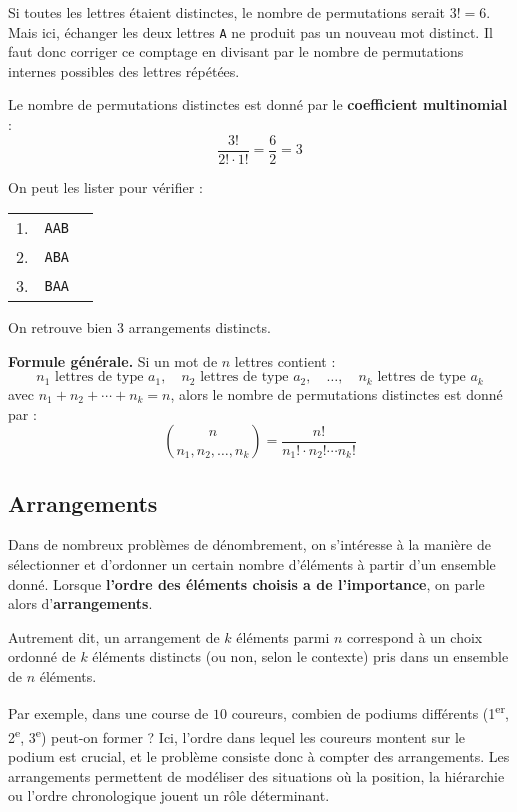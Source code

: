 \documentclass[12pt]{article}
\newcommand{\espace}{\vspace{1.5em}}
\newcommand{\petitespace}{\vspace{0.5cm}}
\newcommand{\1}{\bb{1}} %
\begin{document}
Si toutes les lettres étaient distinctes, le nombre de permutations serait $3! = 6$. Mais ici, échanger les deux lettres \texttt{A} ne produit pas un nouveau mot distinct. Il faut donc corriger ce comptage en divisant par le nombre de permutations internes possibles des lettres répétées.

Le nombre de permutations distinctes est donné par le \textbf{coefficient multinomial} :
\[
\frac{3!}{2! \cdot 1!} = \frac{6}{2} = 3
\]

On peut les lister pour vérifier :

\begin{center}
\begin{tabular}{lll}
1. & \texttt{AAB} \\
2. & \texttt{ABA} \\
3. & \texttt{BAA}
\end{tabular}
\end{center}

On retrouve bien $3$ arrangements distincts.

\medskip

\noindent\textbf{Formule générale.} Si un mot de $n$ lettres contient :
\[
n_1 \text{ lettres de type } a_1,\quad n_2 \text{ lettres de type } a_2,\quad \dots,\quad n_k \text{ lettres de type } a_k
\]
avec \( n_1 + n_2 + \cdots + n_k = n \), alors le nombre de permutations distinctes est donné par :
\[
\binom{n}{n_1, n_2, \dots, n_k} = \frac{n!}{n_1! \cdot n_2! \cdots n_k!}
\]



\espace

\subsection{Arrangements}\petitespace

Dans de nombreux problèmes de dénombrement, on s'intéresse à la manière de sélectionner et d’ordonner un certain nombre d’éléments à partir d’un ensemble donné. Lorsque \textbf{l’ordre des éléments choisis a de l’importance}, on parle alors d’\textbf{arrangements}.

Autrement dit, un arrangement de $k$ éléments parmi $n$ correspond à un choix ordonné de $k$ éléments distincts (ou non, selon le contexte) pris dans un ensemble de $n$ éléments.

Par exemple, dans une course de $10$ coureurs, combien de podiums différents (1\textsuperscript{er}, 2\textsuperscript{e}, 3\textsuperscript{e}) peut-on former ? Ici, l’ordre dans lequel les coureurs montent sur le podium est crucial, et le problème consiste donc à compter des arrangements. Les arrangements permettent de modéliser des situations où la position, la hiérarchie ou l’ordre chronologique jouent un rôle déterminant.
\end{document}
